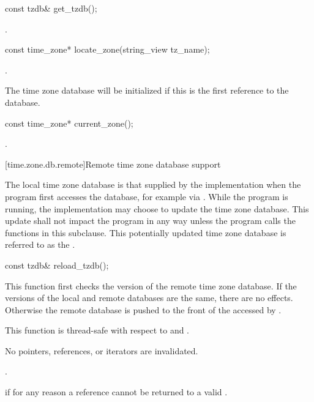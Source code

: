 %
\begin{itemdecl}
const tzdb& get_tzdb();
\end{itemdecl}

\begin{itemdescr}
\pnum
\returns
{}.
\end{itemdescr}

%
\begin{itemdecl}
const time_zone* locate_zone(string_view tz_name);
\end{itemdecl}

\begin{itemdescr}
\pnum
\returns
{}.

\pnum
\begin{note}
The time zone database will be initialized
if this is the first reference to the database.
\end{note}
\end{itemdescr}

%
\begin{itemdecl}
const time_zone* current_zone();
\end{itemdecl}

\begin{itemdescr}
\pnum
\returns
{}.
\end{itemdescr}

[time.zone.db.remote]{Remote time zone database support}

\pnum
The local time zone database
is that supplied by the implementation
when the program first accesses the database,
for example via .
While the program is running,
the implementation may choose to update the time zone database.
This update shall not impact the program in any way
unless the program calls the functions in this subclause.
This potentially updated time zone database
is referred to as the .

%
\begin{itemdecl}
const tzdb& reload_tzdb();
\end{itemdecl}

\begin{itemdescr}
\pnum
\effects
This function first checks
the version of the remote time zone database.
If the versions of the local and remote databases are the same,
there are no effects.
Otherwise the remote database is pushed
to the front of the 
accessed by .

\pnum
\sync
This function is thread-safe with respect to
 and .

\pnum
\ensures
No pointers, references, or iterators are invalidated.

\pnum
\returns
{}.

\pnum
\throws
{} if for any reason
a reference cannot be returned to a valid .
\end{itemdescr}

